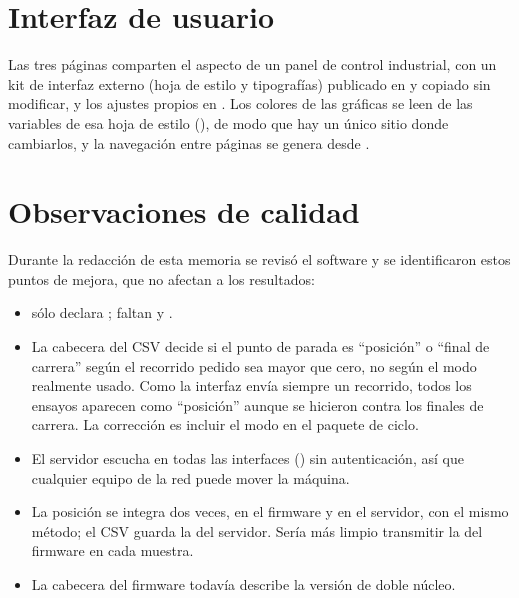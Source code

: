 \section{Interfaz de usuario}

Las tres páginas comparten el aspecto de un panel de control industrial, con un kit de interfaz
externo (hoja de estilo y tipografías) publicado en  y copiado sin modificar, y los
ajustes propios en . Los colores de las gráficas se leen de las variables
de esa hoja de estilo (), de modo que hay un único sitio donde cambiarlos, y la
navegación entre páginas se genera desde .

\section{Observaciones de calidad}

Durante la redacción de esta memoria se revisó el software y se identificaron estos puntos de
mejora, que no afectan a los resultados:
\begin{itemize}
  \item {} sólo declara ; faltan  y
        .
  \item La cabecera del CSV decide si el punto de parada es ``posición'' o ``final de carrera'' según
        el recorrido pedido sea mayor que cero, no según el modo realmente usado. Como la interfaz
        envía siempre un recorrido, todos los ensayos aparecen como ``posición'' aunque se hicieron
        contra los finales de carrera. La corrección es incluir el modo en el paquete de ciclo.
  \item El servidor escucha en todas las interfaces () sin autenticación, así que
        cualquier equipo de la red puede mover la máquina.
  \item La posición se integra dos veces, en el firmware y en el servidor, con el mismo método; el
        CSV guarda la del servidor. Sería más limpio transmitir la del firmware en cada muestra.
  \item La cabecera del firmware todavía describe la versión de doble núcleo.
\end{itemize}
